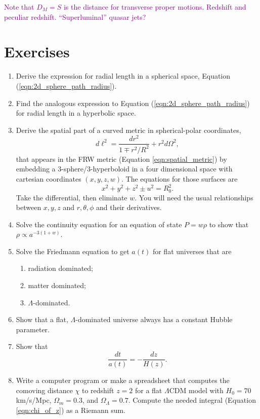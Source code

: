 \textcolor{purple}{Note that $D_M = S$ is the distance for transverse proper motions.  Redshift and peculiar redshift.  ``Superluminal'' quasar jets?}


\section*{Exercises}



\begin{enumerate}

\item Derive the expression for radial length in a spherical space, Equation (\ref{eqn:2d_sphere_path_radius}).

\item Find the analogous expression to Equation (\ref{eqn:2d_sphere_path_radius}) for  radial length in a hyperbolic space.

\item Derive the spatial part of a curved metric in spherical-polar coordinates,
  \begin{equation*}
    d\ell^2 = \frac{dr^2}{1 \mp r^2/R^2} + r^2 d\Omega^2, 
  \end{equation*}
  that appears in the FRW metric (Equation \ref{eqn:spatial_metric})
by embedding a 3-sphere/3-hyperboloid in a four dimensional space with cartesian coordinates $(x,y,z,w)$.  The equations for those surfaces are
\begin{equation*}
  x^2 + y^2 + z^2 \pm u^2 = R_0^2.
\end{equation*}
Take the differential, then eliminate $w$.  You will need the usual relationships between $x,y,z$ and $r,\theta,\phi$ and their derivatives.


  
\item Solve the continuity equation for an equation of state $P = w\rho$ to show that $\rho \propto a^{-3(1+w)}$. 

  
\item Solve the Friedmann equation to get $a(t)$ for flat universes that are
  \begin{enumerate}
  \item radiation dominated;
  \item matter dominated;
  \item $\Lambda$-dominated.
  \end{enumerate}

\item Show that a flat, $\Lambda$-dominated universe always has a constant Hubble parameter.

\item Show that
  \begin{equation} \frac{dt}{a(t)} = - \frac{dz}{H(z)}. \end{equation}


\item Write a computer program or make a spreadsheet that computes the comoving distance $\chi$ to redshift $z=2$ for a flat $\Lambda$CDM model with $H_0 = 70$ km/s/Mpc, $\Omega_m = 0.3$, and $\Omega_\Lambda = 0.7$.  Compute the needed integral (Equation \ref{eqn:chi_of_z}) as a Riemann sum.

  
\end{enumerate}
